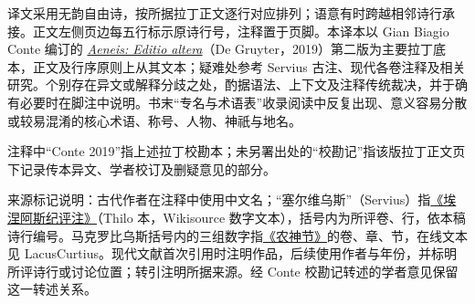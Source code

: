 {\fontsize{10}{15}\selectfont
译文采用无韵自由诗，按所据拉丁正文逐行对应排列；语意有时跨越相邻诗行承接。正文左侧页边每五行标示原诗行号，注释置于页脚。本译本以 Gian Biagio Conte 编订的 \href{https://doi.org/10.1515/9783110649031}{\textit{Aeneis: Editio altera}}（De Gruyter，2019）第二版为主要拉丁底本，正文及行序原则上从其文本；疑难处参考 Servius 古注、现代各卷注释及相关研究。个别存在异文或解释分歧之处，酌据语法、上下文及注释传统裁决，并于确有必要时在脚注中说明。书末“专名与术语表”收录阅读中反复出现、意义容易分散或较易混淆的核心术语、称号、人物、神祇与地名。
\par
注释中“Conte 2019”指上述拉丁校勘本；未另署出处的“校勘记”指该版拉丁正文页下记录传本异文、学者校订及删疑意见的部分。
\par
来源标记说明：古代作者在注释中使用中文名；“塞尔维乌斯”（Servius）指\href{https://la.wikisource.org/wiki/In_Vergilii_Aeneidem_commentarii}{《埃涅阿斯纪评注》}（Thilo 本，Wikisource 数字文本），括号内为所评卷、行，依本稿诗行编号。马克罗比乌斯括号内的三组数字指\href{https://penelope.uchicago.edu/Thayer/L/Roman/Texts/Macrobius/Saturnalia/6*.html}{《农神节》}的卷、章、节，在线文本见 LacusCurtius。现代文献首次引用时注明作品，后续使用作者与年份，并标明所评诗行或讨论位置；转引注明所据来源。经 Conte 校勘记转述的学者意见保留这一转述关系。
\par}
